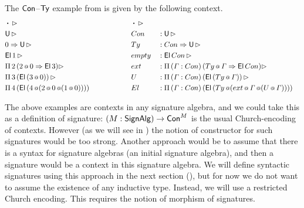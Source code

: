 \documentclass[a4paper,UKenglish,cleveref, autoref]{lipics-v2019}
\begin{document}
\begin{example}
  The $\mathsf{Con}$--$\mathsf{Ty}$ example from  is given by the
  following context.
  \begin{alignat*}{5}
    & \boldsymbol{\cdot} \,\rhd                                                 && \boldsymbol{\cdot} \,\rhd                                                                \\
    & \mathsf{U}\,\rhd                                                                  && Con && : \mathsf{U}\,\rhd                                                                        \\
    & 0\Rightarrow\mathsf{U}\,\rhd                                                              && Ty && : Con\Rightarrow\mathsf{U}\,\rhd                                                                   \\
    & \mathsf{El}\,1\,\rhd                                                              && empty && : \mathsf{El}\,Con\,\rhd                                                                \\
    & \Pi\,2\,(2\mathop{{\scriptstyle @}} 0 \Rightarrow \mathsf{El}\,3)\rhd                                       && ext && : \Pi\,(\mathit{\Gamma} : Con)\,(Ty\mathop{{\scriptstyle @}}\mathit{\Gamma} \Rightarrow \mathsf{El}\,Con)\rhd                         \\
    & \Pi\,3\,(\mathsf{El}\,(3\mathop{{\scriptstyle @}} 0))\,\rhd                                         && U && : \Pi\,(\mathit{\Gamma}:Con)\,(\mathsf{El}\,(Ty\mathop{{\scriptstyle @}}\mathit{\Gamma}))\,\rhd                                 \\
    & \Pi\,4\,(\mathsf{El}\,(4\mathop{{\scriptstyle @}}(2\mathop{{\scriptstyle @}} 0\mathop{{\scriptstyle @}} (1\mathop{{\scriptstyle @}} 0)))) \hspace{4.79em} && El && : \Pi\,(\mathit{\Gamma} : Con)\,(\mathsf{El}\,(Ty\mathop{{\scriptstyle @}}(ext\mathop{{\scriptstyle @}}\mathit{\Gamma}\mathop{{\scriptstyle @}} (U\mathop{{\scriptstyle @}}\mathit{\Gamma}))))
  \end{alignat*}
\end{example}

The above examples are contexts in any signature algebra, and we could
take this as a definition of signature: $(M:\mathsf{SignAlg})\rightarrow\mathsf{Con}^M$ is the
usual Church-encoding of contexts. However (as we will see in
) the notion of constructor for such signatures
would be too strong. Another approach would be to assume that there is
a syntax for signature algebras (an initial signature algebra), and
then a signature would be a context in this signature algebra. We will
define syntactic signatures using this approach in the next section
(), but for now we do not want to assume
the existence of any inductive type. Instead, we will use a restricted
Church encoding. This requires the notion of morphism of signatures.
\end{document}
